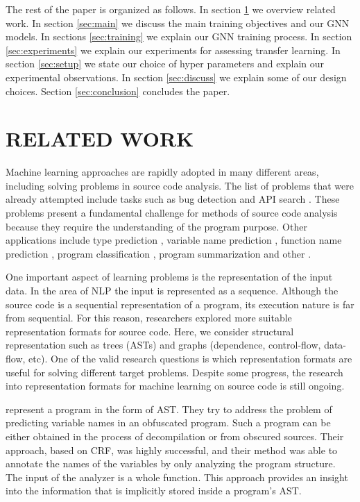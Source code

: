 \documentclass[a4paper,twoside]{article}
\begin{document}
The rest of the paper is organized as follows. In section \ref{sec:related} we overview related work. In section \ref{sec:main} we discuss the main training objectives and our GNN models. In sections \ref{sec:training} we explain our GNN training process. In section \ref{sec:experiments} we explain our experiments for assessing transfer learning. In section \ref{sec:setup} we state our choice of hyper parameters and explain our experimental observations. In section \ref{sec:discuss} we explain some of our design choices. Section \ref{sec:conclusion} concludes the paper.

\section{\uppercase{Related Work}}\label{sec:related}

Machine learning approaches are rapidly adopted in many different areas, including solving problems in source code analysis. The list of problems that were already attempted include tasks such as bug detection \cite{Dinella2020} \cite{Wang2019} and API search \cite{Zhang2019} \cite{Wan2019}. These problems present a fundamental challenge for methods of source code analysis because they require the understanding of the program purpose. Other applications include type prediction \cite{Hellendoorn2018} \cite{Malik2019}, variable name prediction \cite{Cvitkovic2018} \cite{Bichsel2016}, function name prediction \cite{Lacomis2019} \cite{Alon2018}, program classification \cite{Ben-Nun2018} \cite{Zhou2019} \cite{Dam2019}, program summarization \cite{Fernandes2019} \cite{Shido2019} and other \cite{Nguyen2015} \cite{Yang2019} \cite{Chen2019} \cite{Drissi2018}.  

One important aspect of learning problems is the representation of the input data. In the area of NLP the input is represented as a sequence. Although the source code is a sequential representation of a program, its execution nature is far from sequential. For this reason, researchers explored more suitable representation formats for source code. Here, we consider structural representation such as trees (ASTs) and graphs (dependence, control-flow, data-flow, etc). One of the valid research questions is which representation formats are useful for solving different target problems. Despite some progress, the research into representation formats for machine learning on source code is still ongoing.

\cite{Raychev2015} represent a program in the form of AST\@. They try to address the problem of predicting variable names in an obfuscated program. Such a program can be either obtained in the process of decompilation or from obscured sources. Their approach, based on CRF, was highly successful, and their method was able to annotate the names of the variables by only analyzing the program structure. The input of the analyzer is a whole function. This approach provides an insight into the information that is implicitly stored inside a program's AST\@.
\end{document}
